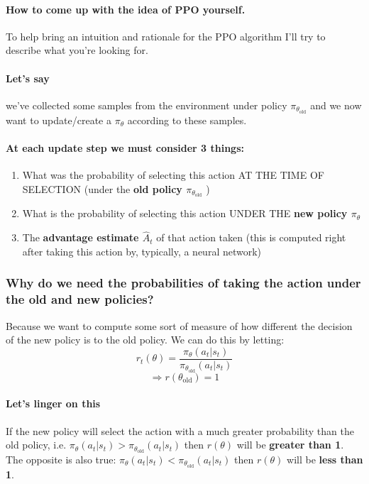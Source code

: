 \documentclass{article}
\begin{document}
\paragraph{How to come up with the idea of PPO yourself.} To help bring an intuition and rationale for the PPO algorithm I'll try to describe what you're looking for.

\paragraph{Let's say} we've collected some samples from the environment under policy \( \pi_{\theta_{\text{old}}} \) and we now want to update/create a \( \pi_\theta\) according to these samples.

\paragraph{At each update step we must consider 3 things:}
\begin{enumerate}
    \item What was the probability of selecting this action AT THE TIME OF SELECTION (under the \textbf{old policy \( \pi_{\theta_{\text{old}}} \)} )
    \item What is the probability of selecting this action UNDER THE \textbf{new policy \( \pi_\theta\) } 
    \item The \textbf{advantage estimate \( \hat{A}_t \)} of that action taken (this is computed right after taking this action by, typically, a neural network)
\end{enumerate}

\subsubsection{Why do we need the probabilities of taking the action under the old and new policies?}
Because we want to compute some sort of measure of how different the decision of the new policy is to the old policy. We can do this by letting:
\[r_t(\theta) = \frac{\pi_\theta (a_t | s_t)}{\pi_{\theta_{\text{old}}} (a_t | s_t)}\]
\[\Rightarrow r(\theta_\text{old}) = 1\]

\paragraph{Let's linger on this} If the new policy will select the action with a much greater probability than the old policy, i.e. \(\pi_\theta (a_t | s_t) > \pi_{\theta_{\text{old}}} (a_t | s_t)\) then \(r(\theta)\) will be \textbf{greater than 1}. \\ The opposite is also true: \(\pi_\theta (a_t | s_t) < \pi_{\theta_{\text{old}}} (a_t | s_t)\) then \(r(\theta)\) will be \textbf{less than 1}.
\end{document}
